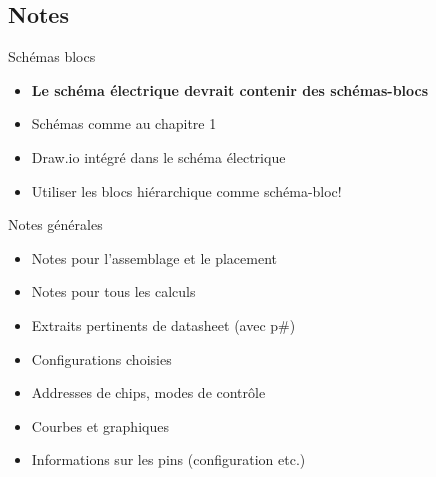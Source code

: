 \begin{frame}[plain]
\end{frame}


\subsection{Notes}

\begin{frame}{Schémas blocs}
    \begin{itemize}
        \item \textbf{Le schéma électrique devrait contenir des schémas-blocs}
        \item Schémas comme au chapitre 1
        \bigskip
        \item Draw.io intégré dans le schéma électrique
        \item Utiliser les blocs hiérarchique comme schéma-bloc!
    \end{itemize}
    \vfill
\end{frame}

\begin{frame}{Notes générales}
    \begin{twocolumns}[0.55]
        \leftcol
        \begin{itemize}
            \item Notes pour l'assemblage et le placement
            \item Notes pour tous les calculs
            \item Extraits pertinents de datasheet (avec p\#)
            \item Configurations choisies
            \item Addresses de chips, modes de contrôle
            \item Courbes et graphiques
            \item Informations sur les pins (configuration etc.)
        \end{itemize}
        \vspace{-6pt}
        \rightcol
        \vspace{-12pt}
    \end{twocolumns}
\end{frame}

